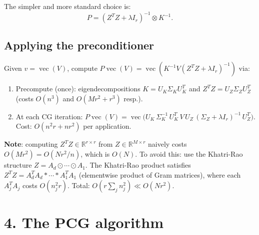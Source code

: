 \documentclass[12pt]{article}
\newcommand{\bR}{\mathbb{R}}
\DeclareMathOperator{\vecop}{vec}
\newcommand{\bR}{\mathbb{R}}
\begin{document}
The simpler and more standard choice is:
\begin{equation}
  \label{eq:precond}
  P = (Z^TZ + \lambda I_r)^{-1}\otimes K^{-1}.
\end{equation}

\subsection*{Applying the preconditioner}

Given $v = \vecop(V)$, compute $P\vecop(V) = \vecop(K^{-1} V (Z^TZ+\lambda I_r)^{-1})$ via:
\begin{enumerate}
  \item Precompute (once): eigendecompositions $K = U_K\Sigma_K U_K^T$ and $Z^TZ = U_Z\Sigma_Z U_Z^T$ (costs $O(n^3)$ and $O(Mr^2 + r^3)$ resp.).
  \item At each CG iteration: $P\vecop(V) = \vecop\!\bigl(U_K\,\Sigma_K^{-1}\,U_K^T\,V\,U_Z\,(\Sigma_Z+\lambda I_r)^{-1}\,U_Z^T\bigr)$.  Cost: $O(n^2 r + nr^2)$ per application.
\end{enumerate}

\textbf{Note}: computing $Z^TZ \in\bR^{r\times r}$ from $Z\in\bR^{M\times r}$ naively costs $O(Mr^2) = O(Nr^2/n)$, which is $O(N)$.  To avoid this: use the Khatri-Rao structure $Z = A_d\odot\cdots\odot A_1$.  The Khatri-Rao product satisfies $Z^TZ = A_d^TA_d\ast\cdots\ast A_1^TA_1$ (elementwise product of Gram matrices), where each $A_j^TA_j$ costs $O(n_j^2 r)$.  Total: $O(r\sum_j n_j^2) \ll O(N r^2)$.

\section*{4. The PCG algorithm}
\end{document}
